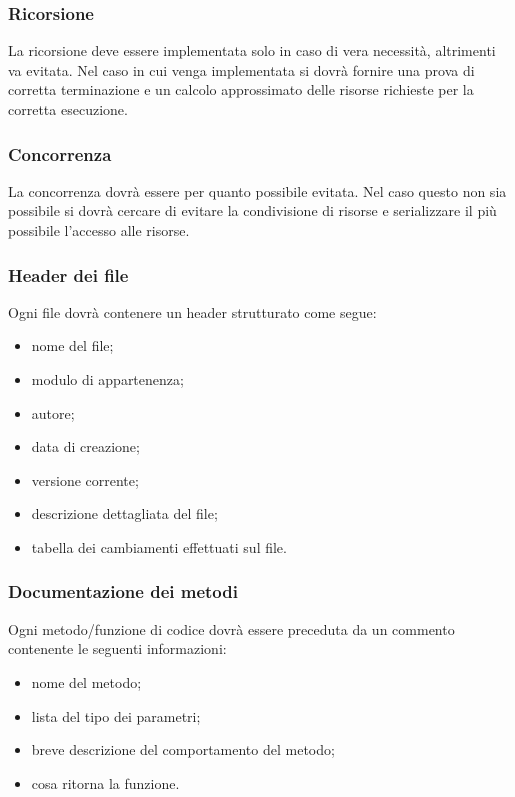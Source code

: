 \subsubsection{Ricorsione}
\label{}
La ricorsione deve essere implementata solo in caso di vera necessità, altrimenti va evitata. Nel caso in cui venga implementata si dovrà fornire una prova di corretta terminazione e un calcolo approssimato delle risorse richieste per la corretta esecuzione.

\subsubsection{Concorrenza}
\label{}

La concorrenza dovrà essere per quanto possibile evitata. Nel caso questo non sia possibile si dovrà cercare di evitare la condivisione di risorse e serializzare il più possibile l'accesso alle risorse.

\subsubsection{Header dei file}
\label{5.3.1}
Ogni file dovrà contenere un header strutturato come segue:
\begin{itemize}
\item {} nome del file;
\item {} modulo di appartenenza;
\item {} autore;
\item {} data di creazione;
\item {} versione corrente;
\item {} descrizione dettagliata del file;
\item {} tabella dei cambiamenti effettuati sul file.
\end{itemize}

\subsubsection{Documentazione dei metodi}
\label{5.3.2}
Ogni metodo/funzione di codice dovrà essere preceduta da un commento contenente le seguenti informazioni:
\begin{itemize}
\item {} nome del metodo;
\item {} lista del tipo dei parametri;
\item {} breve descrizione del comportamento del metodo;
\item {} cosa ritorna la funzione.
\end{itemize}

